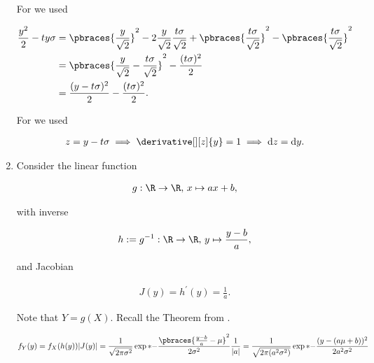 \begin{solution}
\begin{enumerate}[label = (\alph*)]
        For \Quote{!!} we used

        \begin{align*}
            \frac{y^2}{2} - t y \sigma
            & =
            \pbraces{\frac{y}{\sqrt 2}}^2 - 2 \frac{y}{\sqrt 2} \frac{t \sigma}{\sqrt 2} + \pbraces{\frac{t \sigma}{\sqrt 2}}^2 - \pbraces{\frac{t \sigma}{\sqrt 2}}^2 \\
            & =
            \pbraces{\frac{y}{\sqrt 2} - \frac{t \sigma}{\sqrt 2}}^2 - \frac{(t \sigma)^2}{2} \\
            & =
            \frac{(y - t \sigma)^2}{2} - \frac{(t \sigma)^2}{2}.
        \end{align*}

        For \Quote{!!!} we used

        \begin{align*}
            z = y - t \sigma
            \implies
            \derivative[][z]{y} = 1
            \implies
            \mathrm d z = \mathrm d y.
        \end{align*}

        \item Consider the linear function
        
        \begin{align*}
            g:
                \R \to \R, \,
                x \mapsto a x + b,
        \end{align*}

        with inverse

        \begin{align*}
            h := g^{-1}:
                \R \to \R, \,
                y \mapsto \frac{y - b}{a},
        \end{align*}

        and Jacobian

        \begin{align*}
            J(y) = h^\prime(y) = \frac{1}{a}.
        \end{align*}

        Note that $Y = g(X)$.
        Recall the Theorem from \cite[Lecture 3, Slide 32]{EStat}.

        \begin{align*}
            f_Y(y)
            =
            f_X(h(y)) |J(y)|
            =
            \frac{1}{\sqrt{2 \pi \sigma^2}}
            \exp*
            {
                -
                \frac
                {
                    \pbraces
                    {
                        \frac{y - b}{a} - \mu
                    }^2
                }{
                    2 \sigma^2
                }
            }
            \frac{1}{|a|}
            =
            \frac{1}{\sqrt{2 \pi (a^2 \sigma^2)}}
            \exp*
            {
                -
                \frac
                {
                    (y - (a \mu + b))^2
                }{
                    2 a^2 \sigma^2
                }
            }
        \end{align*}


\end{enumerate}
\end{solution}
